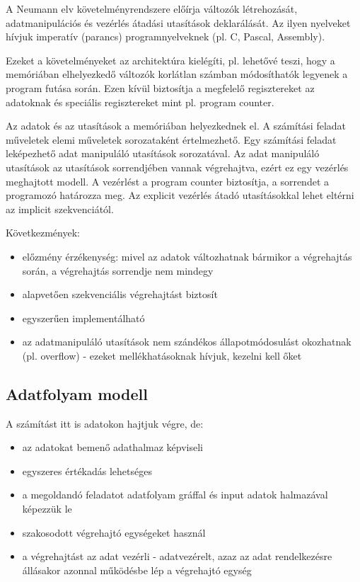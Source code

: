 A Neumann elv követelményrendszere előírja változók létrehozását, adatmanipulációs és vezérlés átadási utasítások deklarálását.
Az ilyen nyelveket hívjuk imperatív (parancs) programnyelveknek (pl. C, Pascal, Assembly).

Ezeket a követelményeket az architektúra kielégíti, pl. lehetővé teszi, hogy a memóriában elhelyezkedő változók korlátlan számban módosíthatók legyenek a program futása során.
Ezen kívül biztosítja a megfelelő regisztereket az adatoknak és speciális regisztereket mint pl. program counter.

Az adatok és az utasítások a memóriában helyezkednek el.
A számítási feladat műveletek elemi műveletek sorozataként értelmezhető.
Egy számítási feladat leképezhető adat manipuláló utasítások sorozatával.
Az adat manipuláló utasítások az utasítások sorrendjében vannak végrehajtva, ezért ez egy vezérlés meghajtott modell.
A vezérlést a program counter biztosítja, a sorrendet a programozó határozza meg.
Az explicit vezérlés átadó utasításokkal lehet eltérni az implicit szekvenciától.

Következmények:
\begin{itemize}
    \item előzmény érzékenység: mivel az adatok változhatnak bármikor a végrehajtás során, a végrehajtás sorrendje nem mindegy
    \item alapvetően szekvenciális végrehajtást biztosít
    \item egyszerűen implementálható
    \item az adatmanipuláló utasítások nem szándékos állapotmódosulást okozhatnak (pl. overflow) - ezeket mellékhatásoknak hívjuk, kezelni kell őket
\end{itemize}

\subsection{Adatfolyam modell}
A számítást itt is adatokon hajtjuk végre, de:
\begin{itemize}
    \item az adatokat bemenő adathalmaz képviseli
    \item egyszeres értékadás lehetséges
    \item a megoldandó feladatot adatfolyam gráffal és input adatok halmazával képezzük le
    \item szakosodott végrehajtó egységeket használ
    \item a végrehajtást az adat vezérli - adatvezérelt, azaz az adat rendelkezésre állásakor azonnal működésbe lép a végrehajtó egység
\end{itemize}